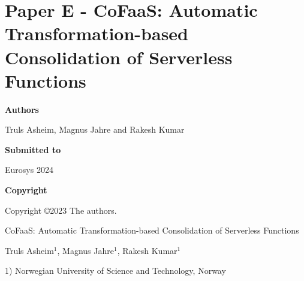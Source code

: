 \documentclass[../../../main.tex]{subfiles}
\begin{document}
\chapter[Paper E - CoFaaS: Consolidation of Serverless Functions]{Paper E - CoFaaS: Automatic Transformation-based Consolidation of Serverless Functions }

\label{chap:eurosys-paper}

\noindent \textbf{Authors}

\vspace*{0.3cm}

\noindent Truls Asheim, Magnus Jahre and Rakesh Kumar

\vspace*{0.7cm}

\noindent \textbf{Submitted to}

\vspace*{0.3cm}

\noindent Eurosys 2024

\vspace*{0.7cm}

\noindent \textbf{Copyright}

\vspace*{0.3cm}

\noindent Copyright ©2023 The authors.

\newpage

\vspace*{0.1cm}

\begin{center}

\Huge{CoFaaS: Automatic Transformation-based Consolidation of Serverless Functions}

\vspace{0.6cm}

\large{Truls Asheim$^{1}$, Magnus Jahre$^{1}$, Rakesh Kumar$^{1}$}

\vspace{0.1cm}

\small{1) Norwegian University of Science and Technology, Norway}


\end{center}
\end{document}
